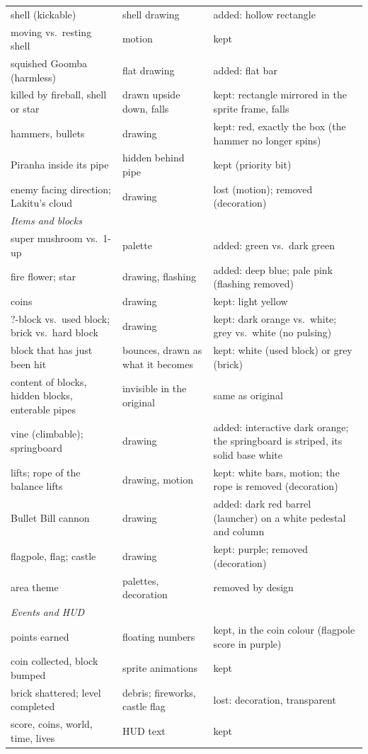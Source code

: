 \documentclass{article}
\begin{document}
\begin{table}[t]
\begin{tabular}{p{3.6cm}p{3.1cm}p{7.6cm}}
    shell (kickable) & shell drawing & added: hollow rectangle \\
    moving vs.\ resting shell & motion & kept \\
    squished Goomba (harmless) & flat drawing & added: flat bar \\
    killed by fireball, shell or star & drawn upside down, falls & kept: rectangle mirrored in the sprite frame, falls \\
    hammers, bullets & drawing & kept: red, exactly the box (the hammer no longer spins) \\
    Piranha inside its pipe & hidden behind pipe & kept (priority bit) \\
    enemy facing direction; Lakitu's cloud & drawing & lost (motion); removed (decoration) \\
    \midrule
    \multicolumn{3}{l}{\textit{Items and blocks}} \\
    super mushroom vs.\ 1-up & palette & added: green vs.\ dark green \\
    fire flower; star & drawing, flashing & added: deep blue; pale pink (flashing removed) \\
    coins & drawing & kept: light yellow \\
    ?-block vs.\ used block; brick vs.\ hard block & drawing & kept: dark orange vs.\ white; grey vs.\ white (no pulsing) \\
    block that has just been hit & bounces, drawn as what it becomes & kept: white (used block) or grey (brick) \\
    content of blocks, hidden blocks, enterable pipes & invisible in the original & same as original \\
    vine (climbable); springboard & drawing & added: interactive dark orange; the springboard is striped, its solid base white \\
    lifts; rope of the balance lifts & drawing, motion & kept: white bars, motion; the rope is removed (decoration) \\
    Bullet Bill cannon & drawing & added: dark red barrel (launcher) on a white pedestal and column \\
    flagpole, flag; castle & drawing & kept: purple; removed (decoration) \\
    area theme & palettes, decoration & removed by design \\
    \midrule
    \multicolumn{3}{l}{\textit{Events and HUD}} \\
    points earned & floating numbers & kept, in the coin colour (flagpole score in purple) \\
    coin collected, block bumped & sprite animations & kept \\
    brick shattered; level completed & debris; fireworks, castle flag & lost: decoration, transparent \\
    score, coins, world, time, lives & HUD text & kept \\
    \bottomrule
  \end{tabular}
  \label{tab:semantics}
\end{table}
\end{document}
